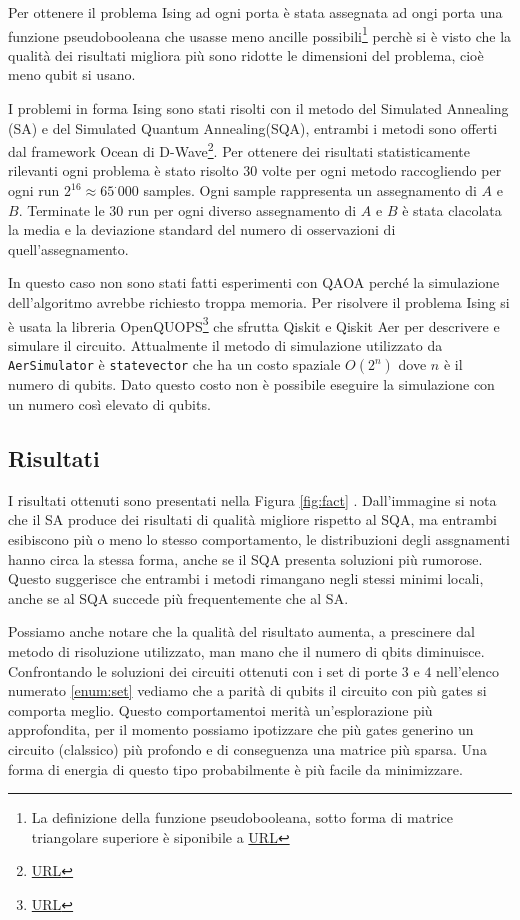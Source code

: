 \documentclass[]{article}
\begin{document}
	Per ottenere il problema Ising ad ogni porta è stata assegnata ad ongi porta una funzione pseudobooleana che usasse meno ancille possibili\footnote{La definizione della funzione pseudobooleana, sotto forma di matrice triangolare superiore è siponibile a \url{URL}} perchè si è visto che la qualità dei risultati migliora più sono ridotte le dimensioni del problema, cioè meno qubit si usano\cite{bibid}.
	
	I problemi in forma Ising sono stati risolti con il metodo del Simulated Annealing (SA) e del Simulated Quantum Annealing(SQA), entrambi i metodi sono offerti dal framework Ocean di D-Wave\footnote{\url{URL}}. Per ottenere dei risultati statisticamente rilevanti ogni problema è stato risolto $30$ volte per ogni metodo raccogliendo per ogni run $2^{16} \approx 65^\cdot000$ samples. Ogni sample rappresenta un assegnamento di $A$ e $B$. Terminate le $30$ run per ogni diverso assegnamento di $A$ e $B$ è stata clacolata la media e la deviazione standard del numero di osservazioni di quell'assegnamento.
	
	In questo caso non sono stati fatti esperimenti con QAOA perché la simulazione dell'algoritmo avrebbe richiesto troppa memoria. Per risolvere il problema Ising si è usata la libreria OpenQUOPS\footnote{\url{URL}} che sfrutta Qiskit e Qiskit Aer per descrivere e simulare il circuito. Attualmente il metodo di simulazione utilizzato da \texttt{AerSimulator} è \texttt{statevector} che ha un costo spaziale $O(2^n)$ dove $n$ è il numero di qubits. Dato questo costo non è possibile eseguire la simulazione con un numero così elevato di qubits.
	\subsection{Risultati}
	I risultati ottenuti sono presentati nella Figura \ref{fig:fact} . Dall'immagine si nota che il SA produce dei risultati di qualità migliore rispetto al SQA, ma entrambi esibiscono più o meno lo stesso comportamento, le distribuzioni degli assgnamenti hanno circa la stessa forma, anche se il SQA presenta soluzioni più rumorose. Questo suggerisce che entrambi i metodi rimangano  negli stessi minimi locali, anche se al SQA succede più frequentemente che al SA.
	
	Possiamo anche notare che la qualità del risultato aumenta, a prescinere dal metodo di risoluzione utilizzato, man mano che il numero di qbits diminuisce. Confrontando le soluzioni dei circuiti ottenuti con i set di porte $3$ e $4$ nell'elenco numerato \ref{enum:set} vediamo che a parità di qubits il circuito con più gates si comporta meglio. Questo comportamentoi merità un'esplorazione più approfondita, per il momento possiamo ipotizzare che più gates generino un circuito (clalssico) più profondo e di conseguenza una matrice più sparsa. Una forma di energia di questo tipo probabilmente è più facile da minimizzare.
	
\end{document}
